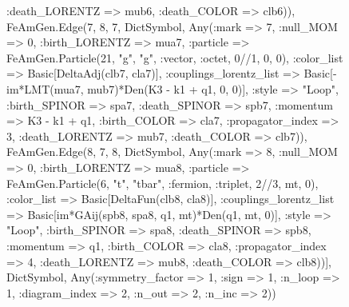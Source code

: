 \documentclass{revtex4}
\begin{document}
\begin{figure}[!htb]
\begin{center}
{:death_LORENTZ => mub6, :death_COLOR => clb6)), FeAmGen.Edge(7, 8, 7, Dict{Symbol, Any}(:mark => 7, :null_MOM => 0, :birth_LORENTZ => mua7, :particle => FeAmGen.Particle(21, "g", "g", :vector, :octet, 0//1, 0, 0), :color_list => Basic[DeltaAdj(clb7, cla7)], :couplings_lorentz_list => Basic[-im*LMT(mua7, mub7)*Den(K3 - k1 + q1, 0, 0)], :style => "Loop", :birth_SPINOR => spa7, :death_SPINOR => spb7, :momentum => K3 - k1 + q1, :birth_COLOR => cla7, :propagator_index => 3, :death_LORENTZ => mub7, :death_COLOR => clb7)), FeAmGen.Edge(8, 7, 8, Dict{Symbol, Any}(:mark => 8, :null_MOM => 0, :birth_LORENTZ => mua8, :particle => FeAmGen.Particle(6, "t", "tbar", :fermion, :triplet, 2//3, mt, 0), :color_list => Basic[DeltaFun(clb8, cla8)], :couplings_lorentz_list => Basic[im*GAij(spb8, spa8, q1, mt)*Den(q1, mt, 0)], :style => "Loop", :birth_SPINOR => spa8, :death_SPINOR => spb8, :momentum => q1, :birth_COLOR => cla8, :propagator_index => 4, :death_LORENTZ => mub8, :death_COLOR => clb8))], Dict{Symbol, Any}(:symmetry_factor => 1, :sign => 1, :n_loop => 1, :diagram_index => 2, :n_out => 2, :n_inc => 2)) 
}
\end{center}
\end{figure}
\end{document}
